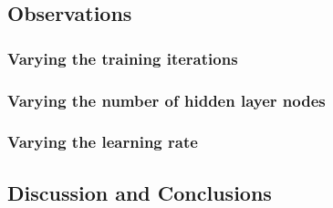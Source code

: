 \documentclass{article}
\begin{document}
\subsection{Observations}
\subsubsection{Varying the training iterations}

\subsubsection{Varying the number of hidden layer nodes}
\subsubsection{Varying the learning rate}
\subsection{Discussion and Conclusions}
\end{document}
